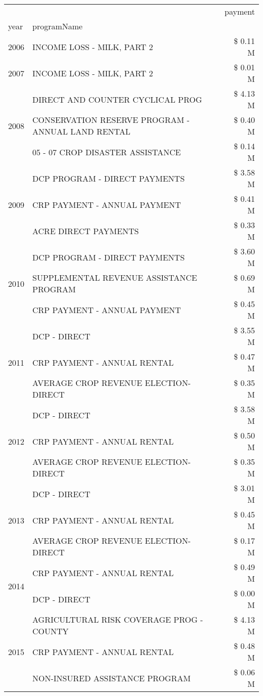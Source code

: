 \begin{tabular}{llr}
\toprule
 &  & payment \\
year & programName &  \\
\midrule
2006 & INCOME LOSS - MILK, PART 2 & \$ 0.11 M \\
\cline{1-3}
2007 & INCOME LOSS - MILK, PART 2 & \$ 0.01 M \\
\cline{1-3}
\multirow[t]{3}{*}{2008} & DIRECT AND COUNTER CYCLICAL PROG & \$ 4.13 M \\
 & CONSERVATION RESERVE PROGRAM - ANNUAL LAND RENTAL & \$ 0.40 M \\
 & 05 - 07 CROP DISASTER ASSISTANCE & \$ 0.14 M \\
\cline{1-3}
\multirow[t]{3}{*}{2009} & DCP PROGRAM - DIRECT PAYMENTS & \$ 3.58 M \\
 & CRP PAYMENT - ANNUAL PAYMENT & \$ 0.41 M \\
 & ACRE DIRECT PAYMENTS & \$ 0.33 M \\
\cline{1-3}
\multirow[t]{3}{*}{2010} & DCP PROGRAM - DIRECT PAYMENTS & \$ 3.60 M \\
 & SUPPLEMENTAL REVENUE ASSISTANCE PROGRAM & \$ 0.69 M \\
 & CRP PAYMENT - ANNUAL PAYMENT & \$ 0.45 M \\
\cline{1-3}
\multirow[t]{3}{*}{2011} & DCP - DIRECT & \$ 3.55 M \\
 & CRP PAYMENT - ANNUAL RENTAL & \$ 0.47 M \\
 & AVERAGE CROP REVENUE ELECTION-DIRECT & \$ 0.35 M \\
\cline{1-3}
\multirow[t]{3}{*}{2012} & DCP - DIRECT & \$ 3.58 M \\
 & CRP PAYMENT - ANNUAL RENTAL & \$ 0.50 M \\
 & AVERAGE CROP REVENUE ELECTION-DIRECT & \$ 0.35 M \\
\cline{1-3}
\multirow[t]{3}{*}{2013} & DCP - DIRECT & \$ 3.01 M \\
 & CRP PAYMENT - ANNUAL RENTAL & \$ 0.45 M \\
 & AVERAGE CROP REVENUE ELECTION-DIRECT & \$ 0.17 M \\
\cline{1-3}
\multirow[t]{2}{*}{2014} & CRP PAYMENT - ANNUAL RENTAL & \$ 0.49 M \\
 & DCP - DIRECT & \$ 0.00 M \\
\cline{1-3}
\multirow[t]{3}{*}{2015} & AGRICULTURAL RISK COVERAGE PROG - COUNTY & \$ 4.13 M \\
 & CRP PAYMENT - ANNUAL RENTAL & \$ 0.48 M \\
 & NON-INSURED ASSISTANCE PROGRAM & \$ 0.06 M \\

\end{tabular}
